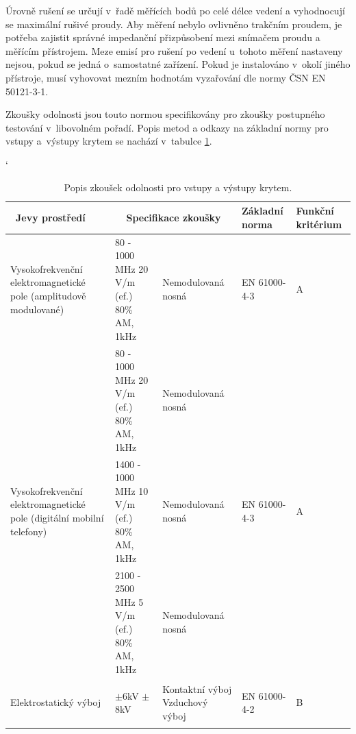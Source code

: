 Úrovně rušení se určují v~řadě měřících bodů po celé délce vedení a vyhodnocují se maximální rušivé proudy. Aby měření nebylo ovlivněno trakčním proudem, je potřeba zajistit správné impedanční přizpůsobení mezi snímačem proudu a měřícím přístrojem. Meze emisí pro rušení po vedení u~tohoto měření nastaveny nejsou, pokud se jedná o~samostatné zařízení. Pokud je instalováno v~okolí jiného přístroje, musí vyhovovat mezním hodnotám vyzařování dle normy ČSN EN 50121-3-1.

Zkoušky odolnosti jsou touto normou specifikovány pro zkoušky postupného testování v~libovolném pořadí. Popis metod a odkazy na základní normy pro vstupy a~výstupy krytem se nachází v~tabulce \ref{tab:emc_odolnosti1}.

\begin{table}[!h]
\catcode`
\begin{center}
  	\caption{Popis zkoušek odolnosti pro vstupy a výstupy krytem.}
  	\label{tab:emc_odolnosti1}
\begin{tabular}{|p{}|p{}|p{}|p{}|p{}|}
	\hline
	{\bf\ Jevy prostředí} 	& \multicolumn{2}{c}{\bf Specifikace zkoušky}\vline & {\bf Základní norma} & {\bf Funkční kritérium} \\
	\hline
	\hline
	Vysokofrekvenční elektromagnetické pole (amplitudově modulované) & 80 - 1000 MHz 20 V/m (ef.) 80\% AM, 1kHz & Nemodulovaná nosná	& \begin{center}EN 61000-4-3 		\end{center}& \begin{center} A~\end{center} \\ 
	\hline
	 & 80 - 1000 MHz 20 V/m (ef.) 80\% AM, 1kHz & Nemodulovaná nosná &   &  \\
	\cline{2-3}
	Vysokofrekvenční elektromagnetické pole (digitální mobilní telefony) & 1400 - 1000 MHz 10 V/m (ef.) 80\% AM, 1kHz & Nemodulovaná nosná & 	\begin{center}  EN 61000-4-3  \end{center} & \begin{center} A~\end{center} \\
	\cline{2-3}
	& 2100 - 2500 MHz 5 V/m (ef.) 80\% AM, 1kHz & Nemodulovaná nosná	&  &  \\
	\hline
	Elektrostatický výboj & \begin{center} $\pm$6kV $\pm$8kV \end{center} & Kontaktní výboj \mbox{Vzduchový} výboj &\begin{center}EN 61000-4-2 \end{center} 
	& \begin{center}B\end{center} \\
	\hline
\end{tabular}
\end{center}
\end{table}

